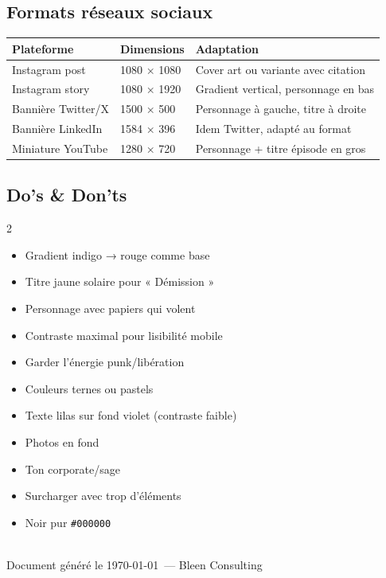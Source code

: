 \documentclass[a4paper,11pt]{article}
\newcommand{\tableheader}{\rowcolor{tableHeader}\bfseries}
\newcommand{\doitem}[1]{\item[\color{lgdGreen}\ding{51}] #1}
\newcommand{\dontitem}[1]{\item[\color{lgdRed}\ding{55}] #1}
\begin{document}
\subsection{Formats réseaux sociaux}

\begin{tcolorbox}[card]
\begin{tabularx}{\textwidth}{@{}llX@{}}
\toprule
\tableheader Plateforme & Dimensions & Adaptation \\
\midrule
Instagram post & 1080 × 1080 & Cover art ou variante avec citation \\
Instagram story & 1080 × 1920 & Gradient vertical, personnage en bas \\
Bannière Twitter/X & 1500 × 500 & Personnage à gauche, titre à droite \\
Bannière LinkedIn & 1584 × 396 & Idem Twitter, adapté au format \\
Miniature YouTube & 1280 × 720 & Personnage + titre épisode en gros \\
\bottomrule
\end{tabularx}
\end{tcolorbox}

\subsection{Do's \& Don'ts}

\begin{multicols}{2}
\begin{tcolorbox}[card, title={\color{lgdGreen!80!black}Do's}, colframe=lgdGreen!30, borderline north={2pt}{0pt}{lgdGreen}]
\begin{itemize}[nosep, leftmargin=16pt]
  \doitem{Gradient indigo → rouge comme base}
  \doitem{Titre jaune solaire pour « Démission »}
  \doitem{Personnage avec papiers qui volent}
  \doitem{Contraste maximal pour lisibilité mobile}
  \doitem{Garder l'énergie punk/libération}
\end{itemize}
\end{tcolorbox}

\begin{tcolorbox}[card, title={\color{lgdRed}Don'ts}, colframe=lgdRed!30, borderline north={2pt}{0pt}{lgdRed}]
\begin{itemize}[nosep, leftmargin=16pt]
  \dontitem{Couleurs ternes ou pastels}
  \dontitem{Texte lilas sur fond violet (contraste faible)}
  \dontitem{Photos en fond}
  \dontitem{Ton corporate/sage}
  \dontitem{Surcharger avec trop d'éléments}
  \dontitem{Noir pur \texttt{\#000000}}
\end{itemize}
\end{tcolorbox}
\end{multicols}

\vfill

\begin{center}
\\[8pt]
{\small\color{grayMid} Document généré le \today\ — Bleen Consulting}
\end{center}
\end{document}
